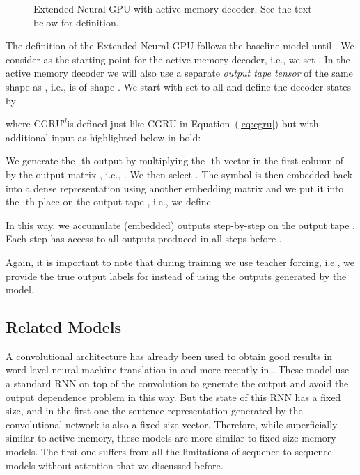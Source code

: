 \documentclass{article}
\newcommand\dcgru{\ensuremath{\mathrm{CGRU}^d}}
\begin{document}
\begin{figure}
\begin{center}
\end{center}

\caption{Extended Neural GPU with active memory decoder. See the text
  below for definition.}
\label{fig:cgrnext}
\end{figure}

The definition of the Extended Neural GPU follows the baseline
model until . We consider  as the starting point
for the active memory decoder, i.e., we set . In the
active memory decoder we will also use a separate \emph{output tape tensor}
 of the same shape as , i.e.,  is of shape .
We start with  set to all  and define the decoder states by

where \dcgru is defined just like CGRU in Equation~(\ref{eq:cgru})
but with additional input as highlighted below in bold:


We generate the -th output by multiplying the -th vector in
the first column of  by the output matrix , i.e.,
. We then select .
The symbol  is then embedded back into a dense representation
using another embedding matrix  and we put it into the -th
place on the output tape , i.e., we define

In this way, we accumulate (embedded) outputs step-by-step
on the output tape . Each step  has access to all
outputs produced in all steps before .

Again, it is important to note that during training we use
teacher forcing, i.e., we provide the true output labels
for  instead of using the outputs generated by the model.


\subsection{Related Models}

A convolutional architecture has already been used to obtain good results in
word-level neural machine translation in \cite{KalchbrennerB13} and more
recently in \cite{MengLWLJL15}.
These model use a standard RNN on top of the convolution to generate the output
and avoid the output dependence problem in this way. But the state of this RNN
has a fixed size, and in the first one the sentence representation generated by
the convolutional network is also a fixed-size vector. Therefore, while superficially
similar to active memory, these models are more similar to fixed-size memory models.
The first one suffers from all the limitations of sequence-to-sequence models
without attention \cite{sutskever14,cho2014learning} that we discussed before.
\end{document}
